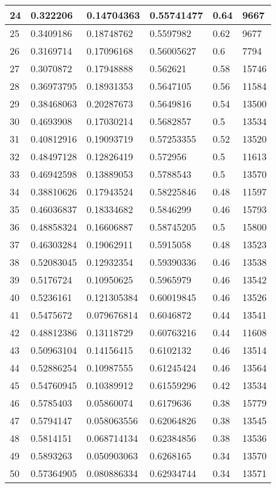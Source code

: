 \begin{longtable}{|l|l|l|l|l|l|}
24 & 0.322206 & 0.14704363 & 0.55741477 & 0.64 & 9667 \\ \hline 
25 & 0.3409186 & 0.18748762 & 0.5597982 & 0.62 & 9677 \\ \hline 
26 & 0.3169714 & 0.17096168 & 0.56005627 & 0.6 & 7794 \\ \hline 
27 & 0.3070872 & 0.17948888 & 0.562621 & 0.58 & 15746 \\ \hline 
28 & 0.36973795 & 0.18931353 & 0.5647105 & 0.56 & 11584 \\ \hline 
29 & 0.38468063 & 0.20287673 & 0.5649816 & 0.54 & 13500 \\ \hline 
30 & 0.4693908 & 0.17030214 & 0.5682857 & 0.5 & 13534 \\ \hline 
31 & 0.40812916 & 0.19093719 & 0.57253355 & 0.52 & 13520 \\ \hline 
32 & 0.48497128 & 0.12826419 & 0.572956 & 0.5 & 11613 \\ \hline 
33 & 0.46942598 & 0.13889053 & 0.5788543 & 0.5 & 13570 \\ \hline 
34 & 0.38810626 & 0.17943524 & 0.58225846 & 0.48 & 11597 \\ \hline 
35 & 0.46036837 & 0.18334682 & 0.5846299 & 0.46 & 15793 \\ \hline 
36 & 0.48858324 & 0.16606887 & 0.58745205 & 0.5 & 15800 \\ \hline 
37 & 0.46303284 & 0.19062911 & 0.5915058 & 0.48 & 13523 \\ \hline 
38 & 0.52083045 & 0.12932354 & 0.59390336 & 0.46 & 13538 \\ \hline 
39 & 0.5176724 & 0.10950625 & 0.5965979 & 0.46 & 13542 \\ \hline 
40 & 0.5236161 & 0.121305384 & 0.60019845 & 0.46 & 13526 \\ \hline 
41 & 0.5475672 & 0.079676814 & 0.6046872 & 0.44 & 13541 \\ \hline 
42 & 0.48812386 & 0.13118729 & 0.60763216 & 0.44 & 11608 \\ \hline 
43 & 0.50963104 & 0.14156415 & 0.6102132 & 0.46 & 13514 \\ \hline 
44 & 0.52886254 & 0.10987555 & 0.61245424 & 0.46 & 13564 \\ \hline 
45 & 0.54760945 & 0.10389912 & 0.61559296 & 0.42 & 13534 \\ \hline 
46 & 0.5785403 & 0.05860074 & 0.6179636 & 0.38 & 15779 \\ \hline 
47 & 0.5794147 & 0.058063556 & 0.62064826 & 0.38 & 13545 \\ \hline 
48 & 0.5814151 & 0.068714134 & 0.62384856 & 0.38 & 13536 \\ \hline 
49 & 0.5893263 & 0.050903063 & 0.6268165 & 0.34 & 13570 \\ \hline 
50 & 0.57364905 & 0.080886334 & 0.62934744 & 0.34 & 13571 \\ \hline 
\end{longtable}